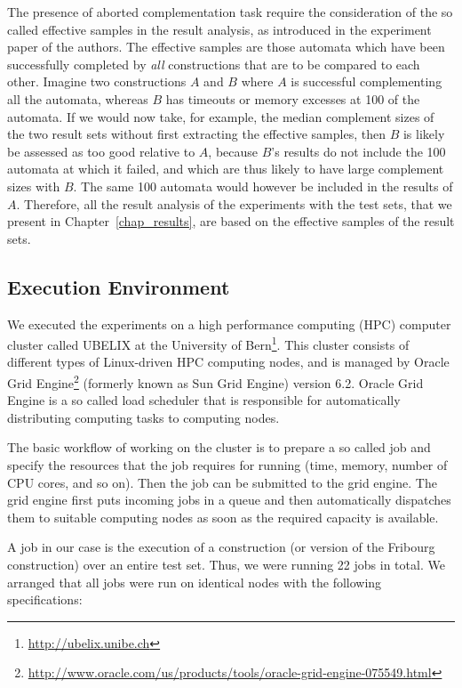 The presence of aborted complementation task require the consideration of the so called effective samples in the result analysis, as introduced in the experiment paper of the \goal{} authors. The effective samples are those automata which have been successfully completed by \textit{all} constructions that are to be compared to each other. Imagine two constructions $A$ and $B$ where $A$ is successful complementing all the automata, whereas $B$ has timeouts or memory excesses at 100 of the automata. If we would now take, for example, the median complement sizes of the two result sets without first extracting the effective samples, then $B$ is likely be assessed as too good relative to $A$, because $B$'s results do not include the 100 automata at which it failed, and which are thus likely to have large complement sizes with $B$. The same 100 automata would however be included in the results of $A$. Therefore, all the result analysis of the experiments with the \goal{} test sets, that we present in Chapter~\ref{chap_results}, are based on the effective samples of the result sets. 


\subsection{Execution Environment}
\label{4_exec_env}
We executed the experiments on a high performance computing (HPC) computer cluster called UBELIX at the University of Bern\footnote{\url{http://ubelix.unibe.ch}}. This cluster consists of different types of Linux-driven HPC computing nodes, and is managed by Oracle Grid Engine\footnote{\url{http://www.oracle.com/us/products/tools/oracle-grid-engine-075549.html}} (formerly known as Sun Grid Engine) version 6.2. Oracle Grid Engine is a so called load scheduler that is responsible for automatically distributing computing tasks to computing nodes.

The basic workflow of working on the cluster is to prepare a so called job and specify the resources that the job requires for running (time, memory, number of CPU cores, and so on). Then the job can be submitted to the grid engine. The grid engine first puts incoming jobs in a queue and then automatically dispatches them to suitable computing nodes as soon as the required capacity is available.

A job in our case is the execution of a construction (or version of the Fribourg construction) over an entire test set. Thus, we were running 22 jobs in total. We arranged that all jobs were run on identical nodes with the following specifications:

